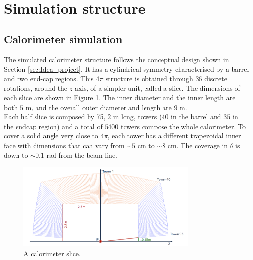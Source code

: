 \section{Simulation structure} \label{sec:Sim_struc}

\subsection{Calorimeter simulation} \label{subsec:Sim_cal}
The simulated calorimeter structure follows the conceptual design shown in Section \ref{sec:Idea_project}. It has a cylindrical symmetry characterised by a barrel and two end-cap regions. This $4\pi$ structure is obtained through $36$ discrete rotations, around the $z$ axis, of a  simpler unit, called a slice. The dimensions of each slice are shown in Figure \ref{fig:cal_slices}. The inner diameter and  the inner length are both $5$ m, and the overall outer diameter and length are $9$ m.\\
Each half slice is composed by 75, $2$ m long, towers ($40$ in the barrel and $35$ in the endcap region) and a total of $5400$ towers compose the whole calorimeter.
To cover a solid angle very close to $4\pi$, each tower has a different trapezoidal inner face with dimensions that can vary from $\sim 5$ cm to $\sim 8$ cm. The coverage in $\theta$ is down to $\sim 0.1$ rad from the beam line.\\

\begin{figure}
	\centering
	\includegraphics[width=0.8\textwidth]{IMG/DRCGeometry1}
	\caption{A calorimeter slice.}
	\label{fig:cal_slices}
\end{figure}

